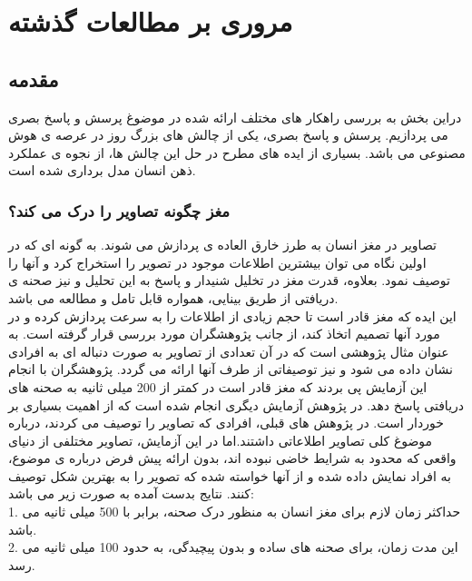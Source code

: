 \chapter{مروری بر مطالعات گذشته}
\section{مقدمه}
دراین بخش به بررسی راهکار های مختلف ارائه شده در موضوغ پرسش و پاسخ بصری می پردازیم. پرسش و پاسخ بصری، یکی از چالش های بزرگ روز در عرصه ی هوش مصنوعی می باشد. بسیاری از ایده های مطرح در حل این چالش ها، از نجوه ی عملکرد ذهن انسان مدل برداری شده است.
\subsection{مغز چگونه تصاویر را درک می کند؟}
تصاویر در مغز انسان به طرز خارق العاده ی پردازش می شوند. به گونه ای که در اولین نگاه می توان بیشترین اطلاعات موجود در تصویر را استخراج کرد و آنها را توصیف نمود. بعلاوه، قدرت مغز در تخلیل شنیدار و پاسخ به این تحلیل و نیز صحنه ی دریافتی از طریق بینایی، همواره قابل تامل و مطالعه می باشد.\\
این ایده که مغز قادر است تا حجم زیادی از اطلاعات را به سرعت پردازش کرده و در مورد آنها تصمیم اتخاذ کند، از جانب پژوهشگران مورد بررسی قرار گرفته است. به عنوان مثال \cite{potter1976short} پژوهشی است که در آن تعدادی از تصاویر به صورت دنباله ای به افرادی نشان داده می شود و نیز توصیفاتی از طرف آنها ارائه می گردد. پژوهشگران با انجام این آزمایش پی بردند که مغز قادر است در کمتر از 200 میلی ثانیه به صحنه های دریافتی پاسخ دهد.
در پژوهش \cite{fei2007we} آزمایش دیگری انجام شده است که از اهمیت بسیاری بر خوردار است. در پژوهش های قبلی، افرادی که تصاویر را توصیف می کردند، درباره موضوغ کلی تصاویر اطلاعاتی داشتند.اما در این آزمایش، تصاویر مختلفی از دنیای واقعی که محدود به شرایط خاضی نبوده اند، بدون ارائه پیش فرض درباره ی موضوع، به افراد نمایش داده شده و از آنها خواسته شده که تصویر را به بهترین شکل توصیف کنند. نتایج بدست آمده به صورت زیر می باشد:\\
1. حداکثر زمان لازم برای مغز انسان به منظور درک صحنه، برابر با 500 میلی ثانیه می باشد.\\
2. این مدت زمان، برای صحنه های ساده و بدون پیچیدگی، به حدود 100 میلی ثانیه می رسد.\\
 
